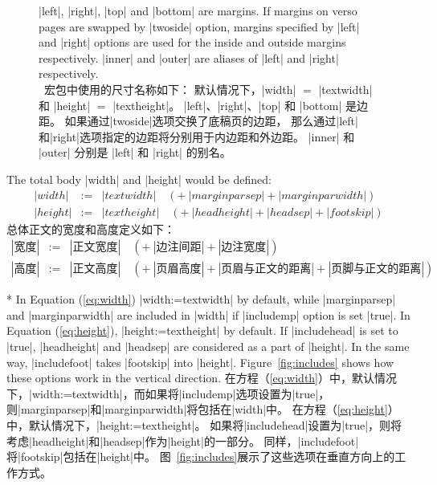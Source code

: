 \begin{figure}
{\begin{minipage}[t]{.8\textwidth}
 |left|, |right|, |top| and |bottom| are margins. 
 If margins on verso pages are swapped by |twoside| option,
 margins specified by |left| and |right| options
 are used for the inside and outside margins respectively.
 |inner| and |outer| are aliases of |left| and |right|
 respectively.\\
 \Gm\ 宏包中使用的尺寸名称如下：
默认情况下，|width| $=$ |textwidth| 和 |height| $=$ |textheight|。
|left|、|right|、|top| 和 |bottom| 是边距。
如果通过|twoside|选项交换了底稿页的边距，
那么通过|left|和|right|选项指定的边距将分别用于内边距和外边距。
|inner| 和 |outer| 分别是 |left| 和 |right| 的别名。
 \end{minipage}}
 \label{fig:layout}
\end{figure}

\begin{paracol}{2}
The total body |width| and |height| would be defined:
\begin{eqnarray}
\label{eq:width}
|width| &:=& |textwidth| \quad( +\>  |marginparsep| + |marginparwidth| )\\
|height| &:=& |textheight| \quad(+\> |headheight| + |headsep| + |footskip| )
\label{eq:height}
\end{eqnarray}
\switchcolumn
总体正文的宽度和高度定义如下：
\begin{eqnarray}
\label{eq:width}
|宽度| &:=& |正文宽度| \quad( +\> |边注间距| + |边注宽度| )\\
|高度| &:=& |正文高度| \quad(+\> |页眉高度| + |页眉与正文的距离| + |页脚与正文的距离| )
\label{eq:height}
\end{eqnarray}

\switchcolumn[0]*
In Equation (\ref{eq:width}) |width:=textwidth| by default, 
while |marginparsep| and |marginparwidth| are included in |width|
if |includemp| option is set |true|. 
In Equation (\ref{eq:height}), |height:=textheight| by default. 
If |includehead| is set to |true|, |headheight| and |headsep| are
considered as a part of |height|.
In the same way, |includefoot| takes |footskip| into |height|. 
Figure~\ref{fig:includes} shows how these options
work in the vertical direction.
\switchcolumn
在方程（\ref{eq:width}）中，默认情况下，|width:=textwidth|，而如果将|includemp|选项设置为|true|，则|marginparsep|和|marginparwidth|将包括在|width|中。
在方程（\ref{eq:height}）中，默认情况下，|height:=textheight|。
如果将|includehead|设置为|true|，则将考虑|headheight|和|headsep|作为|height|的一部分。
同样，|includefoot|将|footskip|包括在|height|中。
图~\ref{fig:includes}展示了这些选项在垂直方向上的工作方式。
\end{paracol}

